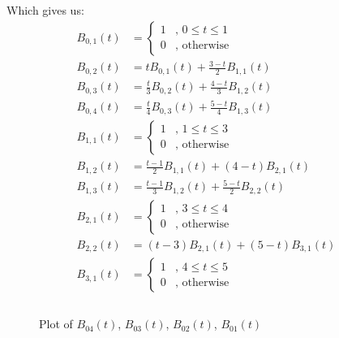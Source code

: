 \documentclass[a4paper,10pt]{article}
\begin{document}
\noindent
Which gives us:
\begin{equation}
\left.\begin{aligned}
B_{0, 1}(t) &=
\begin{cases}
   1 & \text{, } 0 \leq t \leq 1 \\
   0 & \text{, otherwise}
  \end{cases}& \\
B_{0,2}(t) &= tB_{0,1}(t) + \frac{3-t}{2}B_{1,1}(t)& \\
B_{0,3}(t) &= \frac{t}{3}B_{0,2}(t) + \frac{4-t}{3}B_{1,2}(t)& \\
B_{0,4}(t) &= \frac{t}{4}B_{0,3}(t) + \frac{5-t}{4}B_{1,3}(t)&\\
B_{1,1}(t) &= \begin{cases}
   1 & \text{, } 1 \leq t \leq 3 \\
   0 & \text{, otherwise}
  \end{cases}&\\
    B_{1,2}(t) &= \frac{t-1}{2}B_{1,1}(t) + (4-t)B_{2,1}(t)& \\
B_{1,3}(t) &= \frac{t-1}{3}B_{1,2}(t) + \frac{5-t}{2}B_{2,2}(t)& \\
B_{2,1}(t) &= \begin{cases}
   1 & \text{, } 3 \leq t \leq 4 \\
   0 & \text{, otherwise}
  \end{cases}&\\
    B_{2,2}(t) &= (t-3)B_{2,1}(t) + (5-t)B_{3,1}(t)& \\
B_{3,1}(t) &= \begin{cases}
   1 & \text{, } 4 \leq t \leq 5 \\
   0 & \text{, otherwise}
  \end{cases}&\\\\
\end{aligned}\right.
\end{equation}


    \begin{figure}[!htb]\centering

            \caption{Plot of $B_{04}(t)$, $B_{03}(t)$, $B_{02}(t)$, $B_{01}(t)$}
    \end{figure}
\end{document}
